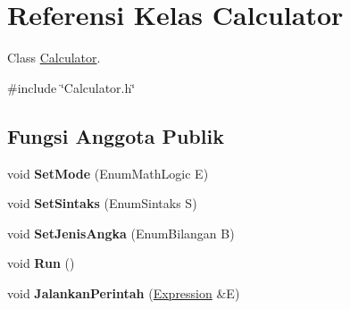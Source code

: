 \hypertarget{classCalculator}{}\section{Referensi Kelas Calculator}
\label{classCalculator}


Class \hyperlink{classCalculator}{Calculator}.  




{\ttfamily \#include \char`\"{}Calculator.\+h\char`\"{}}

\subsection*{Fungsi Anggota Publik}
\begin{DoxyCompactItemize}
\item 
\hypertarget{classCalculator_ae44c9d4718f5e901f0722d51640f1a56}{}void {\bfseries Set\+Mode} (Enum\+Math\+Logic E)\label{classCalculator_ae44c9d4718f5e901f0722d51640f1a56}

\item 
\hypertarget{classCalculator_ae732b97000a76b09cdd877eb41076898}{}void {\bfseries Set\+Sintaks} (Enum\+Sintaks S)\label{classCalculator_ae732b97000a76b09cdd877eb41076898}

\item 
\hypertarget{classCalculator_ae80cd6d1c2a226403d8382b4ca299b8f}{}void {\bfseries Set\+Jenis\+Angka} (Enum\+Bilangan B)\label{classCalculator_ae80cd6d1c2a226403d8382b4ca299b8f}

\item 
\hypertarget{classCalculator_a7fe790b3f7584808f01440946e515e4f}{}void {\bfseries Run} ()\label{classCalculator_a7fe790b3f7584808f01440946e515e4f}

\item 
\hypertarget{classCalculator_aae2ad7e2c24d9aebf745d37d7b80fa00}{}void {\bfseries Jalankan\+Perintah} (\hyperlink{classExpression}{Expression} \&E)\label{classCalculator_aae2ad7e2c24d9aebf745d37d7b80fa00}

\end{DoxyCompactItemize}
